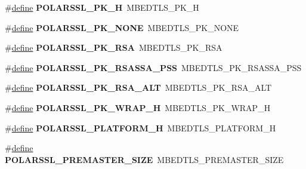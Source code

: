 \begin{DoxyCompactItemize}
\#\hyperlink{structdefine}{define} {\bfseries P\+O\+L\+A\+R\+S\+S\+L\+\_\+\+P\+K\+\_\+H}~M\+B\+E\+D\+T\+L\+S\+\_\+\+P\+K\+\_\+H
\item 
\mbox{\label{compat-1_83_8h_a9ce1fc64494eec6c5fa5d10fb29cb146}} 
\#\hyperlink{structdefine}{define} {\bfseries P\+O\+L\+A\+R\+S\+S\+L\+\_\+\+P\+K\+\_\+\+N\+O\+NE}~M\+B\+E\+D\+T\+L\+S\+\_\+\+P\+K\+\_\+\+N\+O\+NE
\item 
\mbox{\label{compat-1_83_8h_a4816d2741aac7e4869ac397c4eebfa4e}} 
\#\hyperlink{structdefine}{define} {\bfseries P\+O\+L\+A\+R\+S\+S\+L\+\_\+\+P\+K\+\_\+\+R\+SA}~M\+B\+E\+D\+T\+L\+S\+\_\+\+P\+K\+\_\+\+R\+SA
\item 
\mbox{\label{compat-1_83_8h_a414e8174b06ba76dcf1affeab90cdf5c}} 
\#\hyperlink{structdefine}{define} {\bfseries P\+O\+L\+A\+R\+S\+S\+L\+\_\+\+P\+K\+\_\+\+R\+S\+A\+S\+S\+A\+\_\+\+P\+SS}~M\+B\+E\+D\+T\+L\+S\+\_\+\+P\+K\+\_\+\+R\+S\+A\+S\+S\+A\+\_\+\+P\+SS
\item 
\mbox{\label{compat-1_83_8h_a6a985026f42674ddceaed8972658eaba}} 
\#\hyperlink{structdefine}{define} {\bfseries P\+O\+L\+A\+R\+S\+S\+L\+\_\+\+P\+K\+\_\+\+R\+S\+A\+\_\+\+A\+LT}~M\+B\+E\+D\+T\+L\+S\+\_\+\+P\+K\+\_\+\+R\+S\+A\+\_\+\+A\+LT
\item 
\mbox{\label{compat-1_83_8h_a6d5718290ba13de3cb00c6093d4bac7d}} 
\#\hyperlink{structdefine}{define} {\bfseries P\+O\+L\+A\+R\+S\+S\+L\+\_\+\+P\+K\+\_\+\+W\+R\+A\+P\+\_\+H}~M\+B\+E\+D\+T\+L\+S\+\_\+\+P\+K\+\_\+\+W\+R\+A\+P\+\_\+H
\item 
\mbox{\label{compat-1_83_8h_a6b946c73a5b81ca5aad9a06741655121}} 
\#\hyperlink{structdefine}{define} {\bfseries P\+O\+L\+A\+R\+S\+S\+L\+\_\+\+P\+L\+A\+T\+F\+O\+R\+M\+\_\+H}~M\+B\+E\+D\+T\+L\+S\+\_\+\+P\+L\+A\+T\+F\+O\+R\+M\+\_\+H
\item 
\mbox{\label{compat-1_83_8h_a3d43b3813b0d42a149b718a526a824ea}} 
\#\hyperlink{structdefine}{define} {\bfseries P\+O\+L\+A\+R\+S\+S\+L\+\_\+\+P\+R\+E\+M\+A\+S\+T\+E\+R\+\_\+\+S\+I\+ZE}~M\+B\+E\+D\+T\+L\+S\+\_\+\+P\+R\+E\+M\+A\+S\+T\+E\+R\+\_\+\+S\+I\+ZE
\item 
\mbox{\label{compat-1_83_8h_a46921750ea87f288c82f87625922b29a}} 

\end{DoxyCompactItemize}
